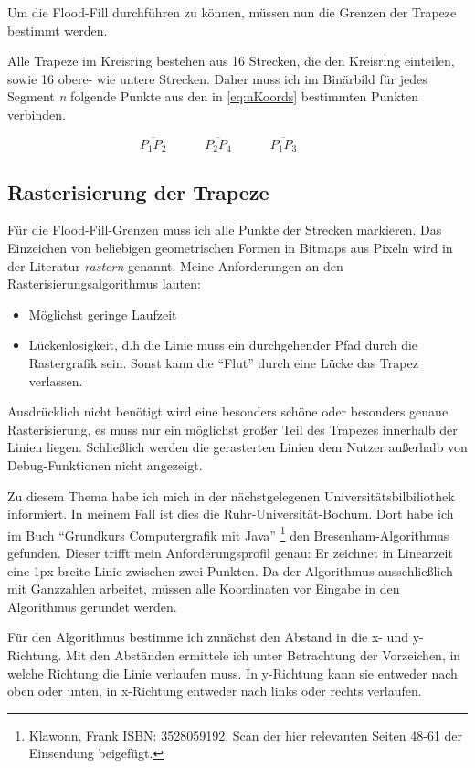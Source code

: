 Um die Flood-Fill durchführen zu können, müssen nun die Grenzen der Trapeze bestimmt werden. 

Alle Trapeze im Kreisring bestehen aus 16 Strecken, die den Kreisring einteilen, sowie 16 obere- wie untere Strecken. Daher muss ich im Binärbild für jedes Segment \textit{n} folgende Punkte aus den in \eqref{eq:nKoords} bestimmten Punkten verbinden.
	
\begin{equation}
	\overline{P_1P_2} \hspace{3em}
	\overline{P_2P_4} \hspace{3em}
	\overline{P_1P_3} \hspace{3em}
\end{equation}

\subsection{Rasterisierung der Trapeze}
Für die Flood-Fill-Grenzen muss ich alle Punkte der Strecken markieren. Das Einzeichen von beliebigen geometrischen Formen in Bitmaps aus Pixeln wird in der Literatur \textit{rastern} genannt. Meine Anforderungen an den Rasterisierungsalgorithmus lauten:
\begin{itemize}
	\item Möglichst geringe Laufzeit
	\item Lückenlosigkeit, d.h die Linie muss ein durchgehender Pfad durch die Rastergrafik sein. Sonst kann die "`Flut"' durch eine Lücke das Trapez verlassen.
\end{itemize}
Ausdrücklich nicht benötigt wird eine besonders schöne oder besonders genaue Rasterisierung, es muss nur ein möglichst großer Teil des Trapezes innerhalb der Linien liegen. Schließlich werden die gerasterten Linien dem Nutzer außerhalb von Debug-Funktionen nicht angezeigt.

Zu diesem Thema habe ich mich in der nächstgelegenen Universitätsbilbiliothek informiert. In meinem Fall ist dies die Ruhr-Universität-Bochum. Dort habe ich im Buch "`Grundkurs Computergrafik mit Java"' \footnote{Klawonn, Frank ISBN: 3528059192. Scan der hier relevanten Seiten 48-61 der Einsendung beigefügt.} den Bresenham-Algorithmus gefunden. Dieser trifft mein Anforderungsprofil genau: Er zeichnet in Linearzeit eine 1px breite Linie zwischen zwei Punkten. Da der Algorithmus ausschließlich mit Ganzzahlen arbeitet, müssen alle Koordinaten vor Eingabe in den Algorithmus gerundet werden.

Für den Algorithmus bestimme ich zunächst den Abstand in die x- und y-Richtung. Mit den Abständen ermittele ich unter Betrachtung der Vorzeichen, in welche Richtung die Linie verlaufen muss. In y-Richtung kann sie entweder nach oben oder unten, in x-Richtung entweder nach links oder rechts verlaufen.

